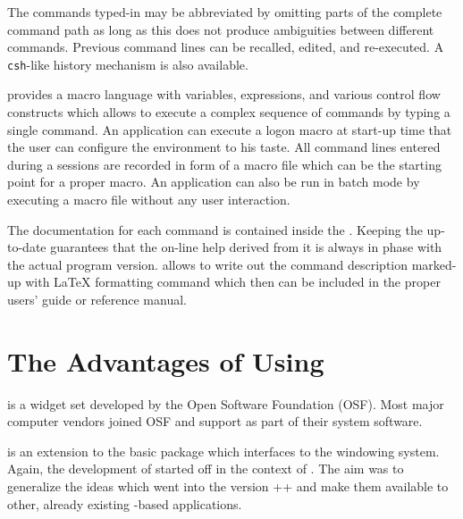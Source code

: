 The commands typed-in may be abbreviated by omitting parts of the
complete command path as long as this does not produce ambiguities
between different commands.
Previous command lines can be recalled, edited, and re-executed.
A \texttt{csh}-like history mechanism is also available.

\KUIP{} provides a macro language with variables, expressions, and
various control flow constructs which allows to execute a complex
sequence of commands by typing a single  command.
An application can execute a logon macro at start-up time that the
user can configure the environment to his taste.
All command lines entered during a sessions are recorded in form of a
macro file which can be the starting point for a proper macro.
An application can also be run in batch mode by executing a macro file
without any user interaction.

The documentation for each command is contained inside the \CDF{}.
Keeping the \CDF{} up-to-date guarantees that the on-line help derived
from it is always in phase with the actual program version.
\KUIP{} allows to write out the command description marked-up with
\LaTeX{} formatting command which then can be included in the proper
users' guide or reference manual.

 
\section{The Advantages of Using \KUIPMotif{}}

\Motif{} \cite{bib-MOTIF} is a widget set developed by the Open
Software Foundation (OSF).
Most major computer vendors joined OSF and support \Motif{} as part of their
system software.

\KUIPMotif{} is an extension to the basic \KUIP{} package which
interfaces to the \Motif{} windowing system.
Again, the development of \KUIPMotif{} started off in the context of
\PAW{}.
The aim was to generalize the ideas which went into the \Motif{}
version \PAW++{} and make them available to other, already
existing \KUIP{}-based applications.

